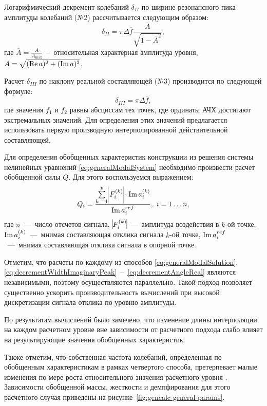 Логарифмический декремент колебаний $ \delta_{II} $ по ширине резонансного пика амплитуды колебаний (№2) рассчитывается следующим образом:
\begin{equation}
	\delta_{II} = \pi \Delta \overline{f} \frac{\overline{A}}{\sqrt{1 - \overline{A} ^ 2}}, \label{eq:decrementWidthAmplitudePeak}
\end{equation}
где $ \overline{A} = \frac{A}{A_{\max}}$~--~относительная характерная амплитуда уровня, $ A = \sqrt{(\operatorname{Re} a) ^ 2 + (\operatorname{Im} a) ^ 2} $.

Расчет  $ \delta_{III} $ по наклону реальной составляющей (№3) производится по следующей формуле:
\begin{equation}
	\delta_{III} = \pi \Delta \overline{f},
	\label{eq:decrementAngleReal}
\end{equation}
где значения $ f_1 $ и $ f_2 $ равны абсциссам тех точек, где ординаты АЧХ достигают экстремальных значений. Для определения этих значений предлагается использовать первую производную интерполированной действительной составляющей.

Для определения обобщенных характеристик конструкции из решения системы нелинейных уравнений \eqref{eq:generalModalSystem} необходимо произвести расчет обобщенной силы $ Q $. Для этого воспользуемся выражением:
\begin{equation}
	Q_i = \frac{\sum\limits_{k\,=\,1} ^ p \vline F_i ^ {(k)} \vline \cdot \imag a_i ^ {(k)}}{\imag a_i ^ {ref}}, \ i = 1 \hdots n,
\end{equation}
где $ n $~---~число отсчетов сигнала, $ \vline F_i ^ {(k)} \vline $~---~амплитуда воздействия в $ k $-ой точке, $ \operatorname{Im} a_i ^ {(k)} $~---~мнимая составляющая отклика сигнала $ k $-ой точке, $ \operatorname{Im} a_i ^ {ref} $~---~мнимая составляющая отклика сигнала в опорной точке.

Отметим, что расчеты по каждому из способов \eqref{eq:generalModalSolution}, \eqref{eq:decrementWidthImaginaryPeak}~--~\eqref{eq:decrementAngleReal} являются независимыми, поэтому осуществляются параллельно. Такой подход позволяет существенно ускорить производительность вычислений при высокой дискретизации сигнала отклика по уровню амплитуды.

По результатам вычислений было замечено, что изменение длины интерполяции на каждом расчетном уровне вне зависимости от расчетного подхода слабо влияет на результирующие значения обобщенных характеристик.

Также отметим, что собственная частота колебаний, определенная по обобщенным характеристикам в рамках четвертого способа, претерпевает малые изменения по мере роста относительного значения расчетного уровня . Зависимости обобщенной массы, жесткости и демпфирования для этого расчетного случая приведены на рисунке~\ref{fig:gencalc-general-params}.

